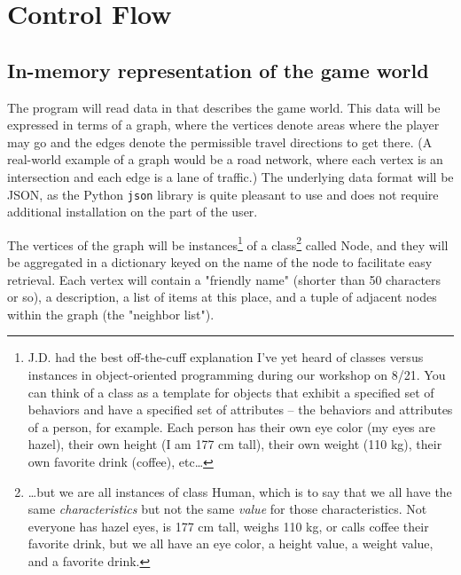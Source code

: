 \documentclass[11pt,letterpaper]{article}
\begin{document}
\section{Control Flow}

\subsection{In-memory representation of the game world}\label{worldGraph}
The program will read data in that describes the game world.  This data will be expressed in terms of a graph, where the vertices denote areas where the player may go and the edges denote the permissible travel directions to get there.  (A real-world example of a graph would be a road network, where each vertex is an intersection and each edge is a lane of traffic.)  The underlying data format will be JSON, as the Python \verb!json! library is quite pleasant to use and does not require additional installation on the part of the user.

The vertices of the graph will be instances\footnote{J.D. had the best off-the-cuff explanation I've yet heard of classes versus instances in object-oriented programming during our workshop on 8/21.  You can think of a class as a template for objects that exhibit a specified set of behaviors and have a specified set of attributes -- the behaviors and attributes of a person, for example.  Each person has their own eye color (my eyes are hazel), their own height (I am 177 cm tall), their own weight (110 kg), their own favorite drink (coffee), etc\ldots} of a class\footnote{\ldots but we are all instances of class Human, which is to say that we all have the same {\it characteristics} but not the same {\it value} for those characteristics.  Not everyone has hazel eyes, is 177 cm tall, weighs 110 kg, or calls coffee their favorite drink, but we all have an eye color, a height value, a weight value, and a favorite drink.} called Node, and they will be aggregated in a dictionary keyed on the name of the node to facilitate easy retrieval.  Each vertex will contain a "friendly name" (shorter than 50 characters or so), a description, a list of items at this place, and a tuple of adjacent nodes within the graph (the "neighbor list").
\end{document}
